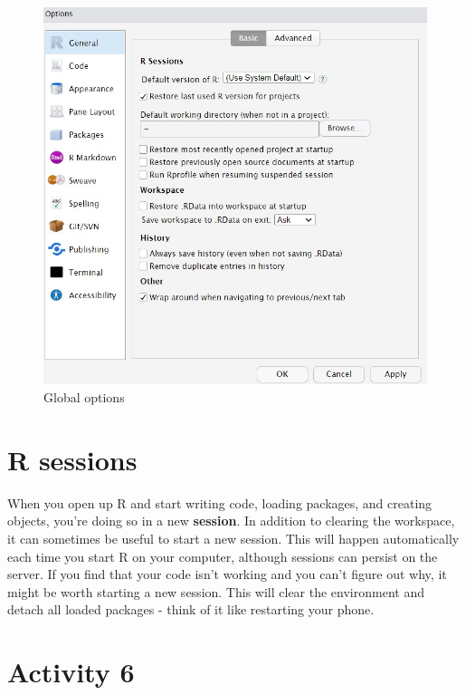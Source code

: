 \documentclass[
  oneside]{book}
\begin{document}
\begin{figure}

{\centering \includegraphics[width=1\linewidth]{images/global_options} 

}

\caption{Global options}\label{fig:img-options}
\end{figure}

\hypertarget{r-sessions}{%
\section{R sessions}\label{r-sessions}}

When you open up R and start writing code, loading packages, and creating objects, you're doing so in a new \textbf{session}. In addition to clearing the workspace, it can sometimes be useful to start a new session. This will happen automatically each time you start R on your computer, although sessions can persist on the server. If you find that your code isn't working and you can't figure out why, it might be worth starting a new session. This will clear the environment and detach all loaded packages - think of it like restarting your phone.

\hypertarget{activity-6}{%
\section{Activity 6}\label{activity-6}}
\end{document}
